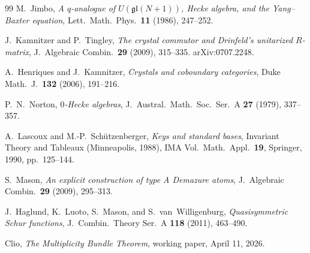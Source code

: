\documentclass[11pt]{article}
\theoremstyle{remark}
\begin{document}
\begin{thebibliography}{99}
M.~Jimbo, \emph{A $q$-analogue of $U(\mathfrak{gl}(N+1))$, Hecke algebra,
and the Yang--Baxter equation}, Lett.\ Math.\ Phys.\ \textbf{11} (1986), 247--252.

J.~Kamnitzer and P.~Tingley, \emph{The crystal commutor and Drinfeld's unitarized
$R$-matrix}, J.\ Algebraic Combin.\ \textbf{29} (2009), 315--335.
arXiv:0707.2248.

A.~Henriques and J.~Kamnitzer, \emph{Crystals and coboundary categories},
Duke Math.\ J.\ \textbf{132} (2006), 191--216.

P.~N.~Norton, \emph{$0$-Hecke algebras}, J.\ Austral.\ Math.\ Soc.\ Ser.~A
\textbf{27} (1979), 337--357.

A.~Lascoux and M.-P.~Sch\"utzenberger, \emph{Keys and standard bases},
Invariant Theory and Tableaux (Minneapolis, 1988), IMA Vol.\ Math.\ Appl.\ \textbf{19},
Springer, 1990, pp.\ 125--144.

S.~Mason, \emph{An explicit construction of type A Demazure atoms},
J.\ Algebraic Combin.\ \textbf{29} (2009), 295--313.

J.~Haglund, K.~Luoto, S.~Mason, and S.~van~Willigenburg,
\emph{Quasisymmetric Schur functions}, J.\ Combin.\ Theory Ser.~A
\textbf{118} (2011), 463--490.

Clio, \emph{The Multiplicity Bundle Theorem}, working paper, April 11, 2026.

\end{thebibliography}
\end{document}
